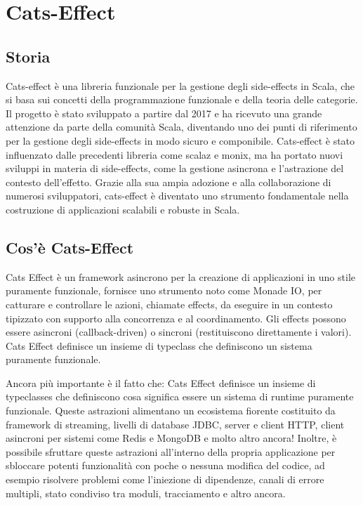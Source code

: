 \chapter{Cats-Effect}

\section{Storia}
Cats-effect è una libreria funzionale per la gestione degli side-effects in Scala, che si basa sui concetti della programmazione funzionale e della teoria delle categorie. Il progetto è stato sviluppato a partire dal 2017 e ha ricevuto una grande attenzione da parte della comunità Scala, diventando uno dei punti di riferimento per la gestione degli side-effects in modo sicuro e componibile. Cats-effect è stato influenzato dalle precedenti libreria come scalaz e monix, ma ha portato nuovi sviluppi in materia di side-effects, come la gestione asincrona e l'astrazione del contesto dell'effetto. Grazie alla sua ampia adozione e alla collaborazione di numerosi sviluppatori, cats-effect è diventato uno strumento fondamentale nella costruzione di applicazioni scalabili e robuste in Scala.

\section{Cos'è Cats-Effect}
Cats Effect è un framework asincrono per la creazione di applicazioni in uno stile puramente funzionale, fornisce uno strumento noto come Monade IO, per catturare e controllare le azioni, chiamate effects, da eseguire in un contesto tipizzato con supporto alla concorrenza e al coordinamento. Gli effects possono essere asincroni (callback-driven) o sincroni (restituiscono direttamente i valori). Cats Effect definisce un insieme di typeclass che definiscono un sistema puramente funzionale.

\noindent Ancora più importante è il fatto che: Cats Effect definisce un insieme di typeclasses che definiscono cosa significa essere un sistema di runtime puramente funzionale. Queste astrazioni alimentano un ecosistema fiorente costituito da framework di streaming, livelli di database JDBC, server e client HTTP, client asincroni per sistemi come Redis e MongoDB e molto altro ancora! Inoltre, è possibile sfruttare queste astrazioni all'interno della propria applicazione per sbloccare potenti funzionalità con poche o nessuna modifica del codice, ad esempio risolvere problemi come l'iniezione di dipendenze, canali di errore multipli, stato condiviso tra moduli, tracciamento e altro ancora.

